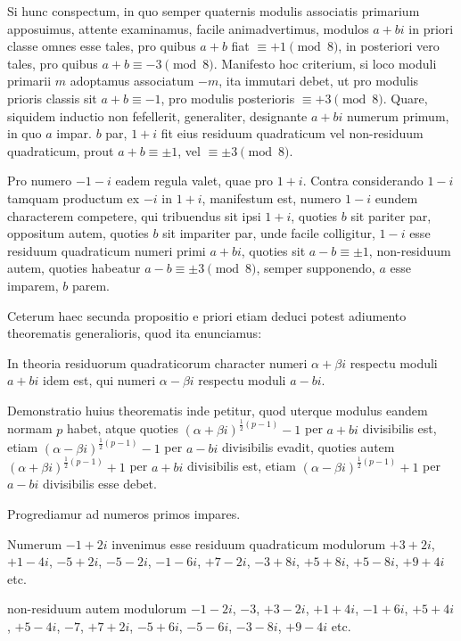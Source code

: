 Si hunc conspectum, in quo semper quaternis modulis associatis primarium apposuimus, attente examinamus, facile animadvertimus, modulos $a+bi$ in priori classe omnes esse tales, pro quibus $a+b$ fiat $\equiv+1\pmod8$, in posteriori vero tales, pro quibus $a+b\equiv-3\pmod8$. Manifesto hoc criterium, si loco moduli primarii $m$ adoptamus associatum $-m$, ita immutari debet, ut pro modulis prioris classis sit $a+b\equiv-1$, pro modulis posterioris $\equiv+3\pmod8$. Quare, siquidem inductio non fefellerit, generaliter, designante $a+bi$ numerum primum, in quo $a$ impar. $b$ par, $1+i$ fit eius residuum quadraticum vel non-residuum quadraticum, prout $a+b\equiv\pm1$, vel $\equiv\pm3\pmod8$.

Pro numero $-1-i$ eadem regula valet, quae pro $1+i$. Contra considerando $1-i$ tamquam productum ex $-i$ in $1+i$, manifestum est, numero $1-i$ eundem characterem competere, qui tribuendus sit ipsi $1+i$, quoties $b$ sit pariter par, oppositum autem, quoties $b$ sit impariter par, unde facile colligitur, $1-i$ esse residuum quadraticum numeri primi $a+bi$, quoties sit $a-b\equiv\pm1$, non-residuum autem, quoties habeatur $a-b\equiv\pm3\pmod8$, semper supponendo, $a$ esse imparem, $b$ parem.

Ceterum haec secunda propositio e priori etiam deduci potest adiumento theorematis generalioris, quod ita enunciamus:

%
In theoria residuorum quadraticorum character numeri $\alpha+\beta i$ respectu moduli $a+bi$ idem est, qui numeri $\alpha-\beta i$ respectu moduli $a-bi$.

Demonstratio huius theorematis inde petitur, quod uterque modulus eandem normam $p$ habet, atque quoties $(\alpha+\beta i)^{\frac12(p-1)}-1$ per $a+bi$ divisibilis est, etiam $(\alpha-\beta i)^{\frac12(p-1)}-1$ per $a-bi$ divisibilis evadit, quoties autem $(\alpha+\beta i)^{\frac12(p-1)}+1$ per $a+bi$ divisibilis est, etiam $(\alpha-\beta i)^{\frac12(p-1)}+1$ per $a-bi$ divisibilis esse debet.

Progrediamur ad numeros primos impares.

Numerum $-1+2i$ invenimus esse residuum quadraticum modulorum $+3+2i$, $+1-4i$, $-5+2i$, $-5-2i$, $-1-6i$, $+7-2i$, $-3+8i$, $+5+8i$, $+5-8i$, $+9+4i$ etc.

non-residuum autem modulorum $-1-2i$, $-3$, $+3-2i$, $+1+4i$, $-1+6i$, $+5+4i$, $+5-4i$, $-7$, $+7+2i$, $-5+6i$, $-5-6i$, $-3-8i$, $+9-4i$ etc.

